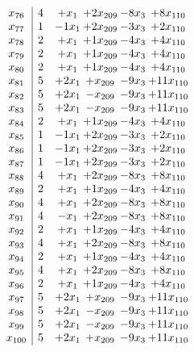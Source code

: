 \documentclass[11pt]{article}
\begin{document}
\[\begin{array}{c| c c@{\hskip 2pt} c@{\hskip 2pt} c@{\hskip 2pt} c@{\hskip 2pt} }
 x_{76}   &  4 & +  x_{1} & + 2 x_{209} & -8 x_{3} & + 8 x_{110}\\
 x_{77}   &  1 & -1 x_{1} & + 2 x_{209} & -3 x_{3} & + 2 x_{110}\\
 x_{78}   &  2 & +  x_{1} & + 1 x_{209} & -4 x_{3} & + 4 x_{110}\\
 x_{79}   &  2 & +  x_{1} & + 1 x_{209} & -4 x_{3} & + 4 x_{110}\\
 x_{80}   &  2 & +  x_{1} & + 1 x_{209} & -4 x_{3} & + 4 x_{110}\\
 x_{81}   &  5 & + 2 x_{1} & +  x_{209} & -9 x_{3} & + 11 x_{110}\\
 x_{82}   &  5 & + 2 x_{1} & - x_{209} & -9 x_{3} & + 11 x_{110}\\
 x_{83}   &  5 & + 2 x_{1} & - x_{209} & -9 x_{3} & + 11 x_{110}\\
 x_{84}   &  2 & +  x_{1} & + 1 x_{209} & -4 x_{3} & + 4 x_{110}\\
 x_{85}   &  1 & -1 x_{1} & + 2 x_{209} & -3 x_{3} & + 2 x_{110}\\
 x_{86}   &  1 & -1 x_{1} & + 2 x_{209} & -3 x_{3} & + 2 x_{110}\\
 x_{87}   &  1 & -1 x_{1} & + 2 x_{209} & -3 x_{3} & + 2 x_{110}\\
 x_{88}   &  4 & +  x_{1} & + 2 x_{209} & -8 x_{3} & + 8 x_{110}\\
 x_{89}   &  2 & +  x_{1} & + 1 x_{209} & -4 x_{3} & + 4 x_{110}\\
 x_{90}   &  4 & +  x_{1} & + 2 x_{209} & -8 x_{3} & + 8 x_{110}\\
 x_{91}   &  4 & - x_{1} & + 2 x_{209} & -8 x_{3} & + 8 x_{110}\\
 x_{92}   &  2 & +  x_{1} & + 1 x_{209} & -4 x_{3} & + 4 x_{110}\\
 x_{93}   &  4 & +  x_{1} & + 2 x_{209} & -8 x_{3} & + 8 x_{110}\\
 x_{94}   &  2 & +  x_{1} & + 1 x_{209} & -4 x_{3} & + 4 x_{110}\\
 x_{95}   &  4 & +  x_{1} & + 2 x_{209} & -8 x_{3} & + 8 x_{110}\\
 x_{96}   &  2 & +  x_{1} & + 1 x_{209} & -4 x_{3} & + 4 x_{110}\\
 x_{97}   &  5 & + 2 x_{1} & +  x_{209} & -9 x_{3} & + 11 x_{110}\\
 x_{98}   &  5 & + 2 x_{1} & - x_{209} & -9 x_{3} & + 11 x_{110}\\
 x_{99}   &  5 & + 2 x_{1} & - x_{209} & -9 x_{3} & + 11 x_{110}\\
 x_{100}   &  5 & + 2 x_{1} & +  x_{209} & -9 x_{3} & + 11 x_{110}\\

\end{array}\]
\end{document}
